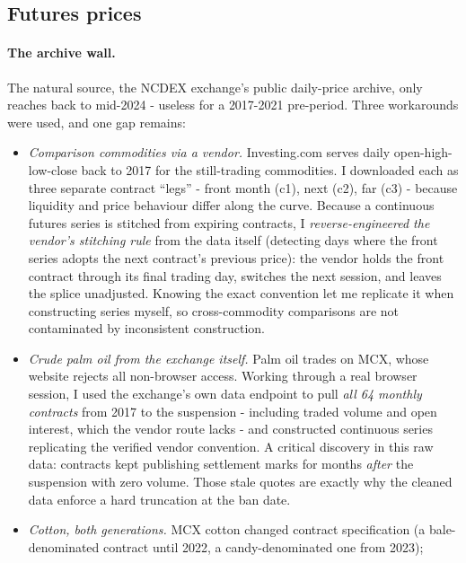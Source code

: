 \documentclass[11pt]{article}
\begin{document}
\subsection{Futures prices}
\label{sec:data-futures}

\paragraph{The archive wall.} The natural source, the NCDEX exchange's public daily-price
archive, only reaches back to mid-2024 - useless for a 2017-2021 pre-period. Three
workarounds were used, and one gap remains:

\begin{itemize}[leftmargin=1.6em,itemsep=1pt]
  \item \emph{Comparison commodities via a vendor.} Investing.com serves daily
        open-high-low-close back to 2017 for the still-trading commodities. I downloaded
        each as three separate contract ``legs'' - front month (c1), next (c2), far
        (c3) - because liquidity and price behaviour differ along the curve. Because a
        continuous futures series is stitched from expiring contracts, I
        \emph{reverse-engineered the vendor's stitching rule} from the data itself
        (detecting days where the front series adopts the next contract's previous price):
        the vendor holds the front contract through its final trading day, switches the
        next session, and leaves the splice unadjusted. Knowing the exact convention let
        me replicate it when constructing series myself, so cross-commodity comparisons
        are not contaminated by inconsistent construction.
  \item \emph{Crude palm oil from the exchange itself.} Palm oil trades on MCX, whose
        website rejects all non-browser access. Working through a real browser session, I
        used the exchange's own data endpoint to pull \emph{all 64 monthly contracts}
        from 2017 to the suspension - including traded volume and open interest, which
        the vendor route lacks - and constructed continuous series replicating the
        verified vendor convention. A critical discovery in this raw data: contracts kept
        publishing settlement marks for months \emph{after} the suspension with zero
        volume. Those stale quotes are exactly why the cleaned data enforce a hard
        truncation at the ban date.
  \item \emph{Cotton, both generations.} MCX cotton changed contract specification
        (a bale-denominated contract until 2022, a candy-denominated one from 2023);

\end{itemize}
\end{document}

